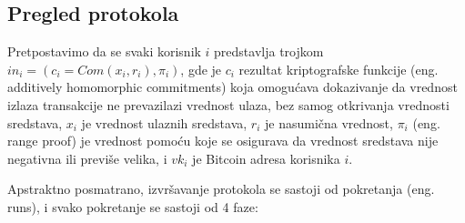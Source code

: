 \documentclass[a4paper]{article}
\begin{document}
\subsection{Pregled protokola}
Pretpostavimo da se svaki korisnik $i$ predstavlja trojkom $in_i = (c_i = Com(x_i, r_i), \pi_i)$, gde je $c_i$ rezultat kriptografske funkcije (eng. additively homomorphic commitments) koja omogućava dokazivanje da vrednost izlaza transakcije ne prevazilazi vrednost ulaza, bez samog otkrivanja vrednosti sredstava, $x_i$ je vrednost ulaznih sredstava, $r_i$ je nasumična vrednost, $\pi_i$ (eng. range proof) je vrednost pomoću koje se osigurava da vrednost sredstava nije negativna ili previše velika, i $vk_i$ je Bitcoin adresa korisnika $i$.

Apstraktno posmatrano, izvršavanje protokola se sastoji od pokretanja (eng. runs), i svako pokretanje se sastoji od 4 faze:
\end{document}
